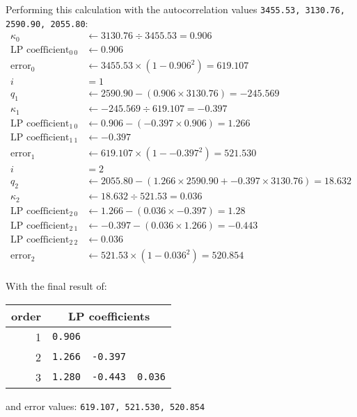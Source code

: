 Performing this calculation with the autocorrelation values
\texttt{3455.53, 3130.76, 2590.90, 2055.80}:
{
\begin{align*}
\kappa_0 &\leftarrow 3130.76 \div 3455.53 = 0.906 \\
\text{LP coefficient}_{0~0} &\leftarrow 0.906 \\
\text{error}_0 &\leftarrow 3455.53 \times (1 - {0.906} ^ 2) = 619.107 \\
i &= 1 \\
q_1 &\leftarrow 2590.90 - (0.906 \times 3130.76) = -245.569 \\
\kappa_1 &\leftarrow -245.569 \div 619.107 = -0.397 \\
\text{LP coefficient}_{1~0} &\leftarrow 0.906 - (-0.397 \times 0.906) = 1.266 \\
\text{LP coefficient}_{1~1} &\leftarrow -0.397 \\
\text{error}_1 &\leftarrow 619.107 \times (1 - {-0.397} ^ 2) = 521.530 \\
i &= 2 \\
q_2 &\leftarrow 2055.80 - (1.266 \times 2590.90 + -0.397 \times 3130.76) = 18.632 \\
\kappa_2 &\leftarrow 18.632 \div 521.53 = 0.036 \\
\text{LP coefficient}_{2~0} &\leftarrow 1.266 - (0.036 \times -0.397) = 1.28 \\
\text{LP coefficient}_{2~1} &\leftarrow -0.397 - (0.036 \times 1.266) = -0.443 \\
\text{LP coefficient}_{2~2} &\leftarrow 0.036 \\
\text{error}_2 &\leftarrow 521.53 \times (1 - {0.036} ^ 2) = 520.854 \\
\end{align*}
}
\par
\noindent
With the final result of:
\begin{table}[h]
\begin{tabular}{r|rrr}
order & \multicolumn{3}{c}{LP coefficients} \\
\hline
1 & \texttt{0.906} \\
2 & \texttt{1.266} & \texttt{-0.397} \\
3 & \texttt{1.280} & \texttt{-0.443} & \texttt{0.036} \\
\end{tabular}
\end{table}
\par
\noindent
and error values: \texttt{619.107, 521.530, 520.854}

\clearpage

